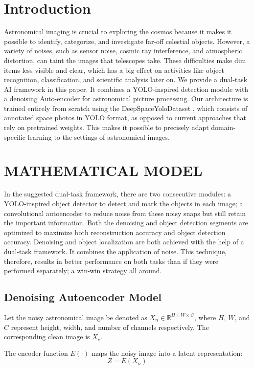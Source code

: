 \documentclass[12pt, conference]{IEEEtran}
\begin{document}
\section{Introduction}
Astronomical imaging is crucial to exploring the cosmos
because it makes it possible to identify, categorize, and investigate far-off celestial objects. However, a variety of noises, such as sensor noise, cosmic ray interference, and atmospheric distortion, can taint the images that telescopes take. These difficulties make dim items less visible and clear, which has a big effect on activities like object recognition, classification, and scientific analysis later on.
We provide a dual-task AI framework in this paper. It
combines a YOLO-inspired \cite{redmon2016you} detection module with a denoising
Auto-encoder for astronomical picture processing. Our architecture is trained entirely from scratch using the DeepSpaceYoloDataset \cite{deepspaceyolo}, which consists of annotated space photos in YOLO \cite{redmon2016you} format, as opposed to current approaches that rely on pretrained weights. This makes it possible to precisely adapt domain-specific learning to the settings of astronomical images.
\section{MATHEMATICAL MODEL}
In the suggested dual-task framework, there are two consecutive modules: a YOLO-inspired \cite{redmon2016you} object detector to detect and mark the objects in each image; a convolutional autoencoder to reduce noise from these noisy snaps but still retain the important information. Both the denoising and object detection segments are optimized to maximize both reconstruction accuracy and object detection accuracy. Denoising and object localization are both achieved with the help of a dual-task framework. It combines the application of noise. This technique, therefore, results in better performance on both tasks than if they were performed separately; a win-win strategy all around.
\subsection{Denoising Autoencoder Model}
Let the noisy astronomical image be denoted as $X_n \in \mathbb{R}^{H \times W \times C}$, where $H$, $W$, and $C$ represent height, width, and number of channels respectively. The corresponding clean image is $X_c$.

The encoder function $E(\cdot)$ maps the noisy image into a latent representation:
$$Z = E(X_n)$$
\end{document}
